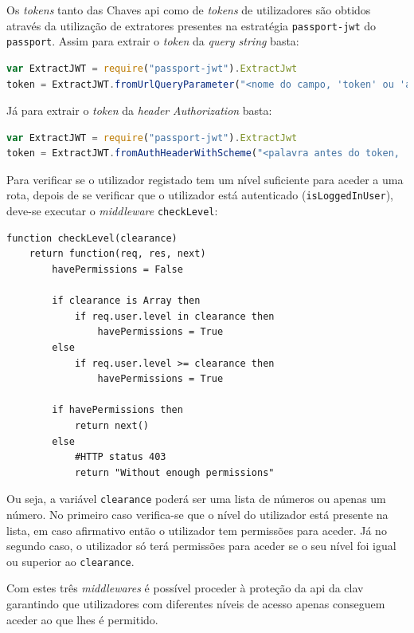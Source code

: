 Os \textit{tokens} tanto das Chaves \acrshort{api} como de \textit{tokens} de utilizadores são obtidos através da utilização de extratores presentes na estratégia \texttt{passport-jwt} do \texttt{passport}. Assim para extrair o \textit{token} da \textit{query string} basta:
\begin{lstlisting}[language=javascript, caption=Extração do \textit{token} da \textit{query string}]
var ExtractJWT = require("passport-jwt").ExtractJwt
token = ExtractJWT.fromUrlQueryParameter("<nome do campo, 'token' ou 'apikey' no caso da CLAV>")
\end{lstlisting}
Já para extrair o \textit{token} da \textit{header} \textit{Authorization} basta:
\begin{lstlisting}[language=javascript, caption=Extração do \textit{token} da \textit{header} \textit{Authorization}]
var ExtractJWT = require("passport-jwt").ExtractJwt
token = ExtractJWT.fromAuthHeaderWithScheme("<palavra antes do token, 'Bearer' no caso dum bearer token, 'token' ou 'apikey' no caso da CLAV>")
\end{lstlisting}

Para verificar se o utilizador registado tem um nível suficiente para aceder a uma rota, depois de se verificar que o utilizador está autenticado (\texttt{isLoggedInUser}), deve-se executar o \textit{middleware} \texttt{checkLevel}:
\begin{lstlisting}[language=pseudocode, caption=Verificação se um utilizador registado tem permissões suficientes para aceder a uma determinada rota]
function checkLevel(clearance)
    return function(req, res, next)
        havePermissions = False

        if clearance is Array then
            if req.user.level in clearance then
                havePermissions = True
        else
            if req.user.level >= clearance then
                havePermissions = True

        if havePermissions then
            return next()
        else
            #HTTP status 403
            return "Without enough permissions"
\end{lstlisting}
Ou seja, a variável \texttt{clearance} poderá ser uma lista de números ou apenas um número. No primeiro caso verifica-se que o nível do utilizador está presente na lista, em caso afirmativo então o utilizador tem permissões para aceder. Já no segundo caso, o utilizador só terá permissões para aceder se o seu nível foi igual ou superior ao \texttt{clearance}.

Com estes três \textit{middlewares} é possível proceder à proteção da \acrshort{api} da \acrshort{clav} garantindo que utilizadores com diferentes níveis de acesso apenas conseguem aceder ao que lhes é permitido.

